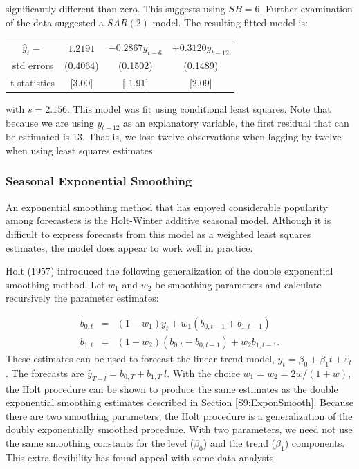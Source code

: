 \noindent significantly different than zero. This suggests using
$SB=6$. Further examination of the data suggested a $SAR(2)$ model.
The resulting fitted model is:

\begin{center}
\begin{tabular}{cccc}
$\widehat{y}_t=$ & $1.2191$ & $-0.2867y_{t-6}$ & $+0.3120y_{t-12}$ \\
{\small std errors} & {\small (0.4064)} & {\small (0.1502)} &
{\small
(0.1489)} \\
{\small t-statistics} & {\small [3.00]} & {\small [-1.91]} & {\small
[2.09]}
\end{tabular}
\end{center}

\noindent with $s=2.156$. This model was fit using conditional least
squares. Note that because we are using $y_{t-12}$ as an explanatory
variable, the first residual that can be estimated is 13. That is,
we lose twelve observations when lagging by twelve when using least
squares estimates.

\linejed

\subsubsection*{Seasonal Exponential Smoothing}

An exponential smoothing method that has enjoyed considerable
popularity among forecasters is the Holt-Winter additive seasonal
model. Although it is difficult to express forecasts from this model
as a weighted least squares estimates, the model does appear to work
well in practice.

Holt (1957) introduced the following generalization of the double
exponential smoothing method. Let $w_1$ and $w_2$ be smoothing
parameters and calculate recursively the parameter estimates:

\begin{eqnarray*}
b_{0,t} &=&(1-w_1)y_t+w_1(b_{0,t-1}+b_{1,t-1}) \\
b_{1,t} &=&(1-w_2)(b_{0,t}-b_{0,t-1})+w_2b_{1,t-1} .
\end{eqnarray*}
These estimates can be used to forecast the linear trend model, $y_t
= \beta_0 + \beta_1 t + \varepsilon_t$. The forecasts are
$\widehat{y}_{T+l} = b_{0,T} + b_{1,T}~l$. With the choice
$w_1=w_2=2w/(1+w)$, the Holt procedure can be shown to produce the
same estimates as the double exponential smoothing estimates
described in Section \ref{S9:ExponSmooth}. Because there are two
smoothing parameters, the Holt procedure is a generalization of the
doubly exponentially smoothed procedure. With two parameters, we
need not use the same smoothing constants for the level ($\beta_0$)
and the trend ($\beta_1$) components. This extra flexibility has
found appeal with some data analysts.

